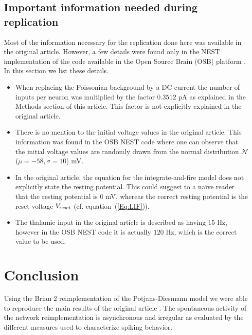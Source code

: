 \documentclass[10pt,a4paper,onecolumn]{article}
\begin{document}
\subsection{Important information needed during replication}

Most of the information necessary for the replication done here was available in the original article. However, a few details were found only in the NEST implementation of the code available in the Open Source Brain (OSB) platform \cite{potjans2014pyNEST}. In this section we list these details.

\begin{itemize}

\item When replacing the Poissonian background by a DC current the number of inputs per neuron was multiplied by the factor $0.3512$ pA as explained in the Methods section of this article. This factor is not explicitly explained in the original article. 

\item There is no mention to the initial voltage values in the original article. This information was found in the OSB NEST code where one can observe that the initial voltage values are randomly drawn from the normal distribution $\mathcal{N}$($\mu=-58 , \sigma = 10$) mV.

\item In the original article, the equation for the integrate-and-fire model does not explicitly state the  resting potential. This could suggest to a na\"ive reader that the resting potential is $0$ mV, whereas the correct resting potential is the reset voltage $V_{\rm reset}$ (cf. equation~(\ref{Eq:LIF})).   

\item The thalamic input in the original article is described as having $15$ Hz, however in the OSB NEST code it is actually $120$ Hz, which is the correct value to be used.

\end{itemize}

\section{Conclusion}\label{conclusion}
Using the Brian 2 reimplementation of the Potjans-Diesmann model we were able to reproduce the main results of the original article \cite{potjans2014}. The spontaneous activity of the network reimplementation is asynchronous and irregular as evaluated by the different measures used to characterize spiking behavior. 
\end{document}
